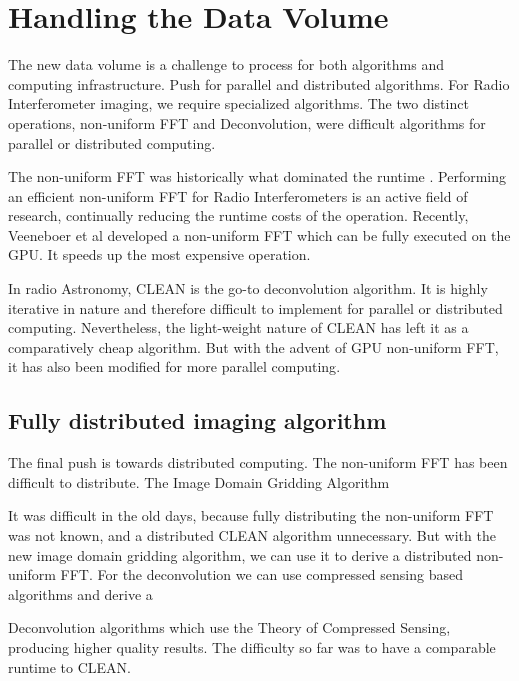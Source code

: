 \section{Handling the Data Volume}\label{volume}
The new data volume is a challenge to process for both algorithms and computing infrastructure. Push for parallel and distributed algorithms. For Radio Interferometer imaging, we require specialized algorithms. The two distinct operations, non-uniform FFT and Deconvolution, were difficult algorithms for parallel or distributed computing.

The non-uniform FFT was historically what dominated the runtime \cite{}. Performing an efficient non-uniform FFT for Radio Interferometers is an active field of research\cite{offringa2014wsclean, pratley2018fast}, continually reducing the runtime costs of the operation. Recently, Veeneboer et al\cite{veenboer2017image} developed a non-uniform FFT which can be fully executed on the GPU. It speeds up the most expensive operation.

In radio Astronomy, CLEAN is the go-to deconvolution algorithm. It is highly iterative in nature and therefore difficult to implement for parallel or distributed computing. Nevertheless, the light-weight nature of CLEAN has left it as a comparatively cheap algorithm. But with the advent of GPU non-uniform FFT, it has also been modified for more parallel computing\cite{parallelCLEAN}.

\subsection{Fully distributed imaging algorithm}

The final push is towards distributed computing. The non-uniform FFT has been difficult to distribute. The Image Domain Gridding Algorithm 

It was difficult in the old days, because fully distributing the non-uniform FFT was not known, and a distributed CLEAN algorithm unnecessary. But with the new image domain gridding algorithm, we can use it to derive a distributed non-uniform FFT. For the deconvolution we can use compressed sensing based algorithms and derive a 

Deconvolution algorithms which use the Theory of Compressed Sensing, producing higher quality results. The difficulty so far was to have a comparable runtime to CLEAN.




